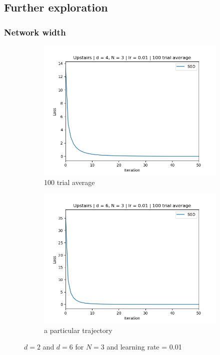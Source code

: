 \documentclass[11pt]{article}
\begin{document}
\subsection{Further exploration}

\subsubsection{Network width}
\begin{figure}[h!]
    \begin{subfigure}{0.5\textwidth}
        \centering
        \includegraphics[width=\textwidth]{images/upstairs_avg_d4.png}
        \caption{100 trial average}
        \label{fig:upstairs_avg_d4}
    \end{subfigure}
    \begin{subfigure}{0.5\textwidth}
        \centering
        \includegraphics[width=\textwidth]{images/upstairs_avg_d6.png}
        \caption{a particular trajectory}
        \label{fig:upstairs_avg_d6}
    \end{subfigure}
    \caption{$d = 2$ and $d=6$ for $N = 3$ and learning rate = 0.01}
    \label{fig:results:width}
\end{figure}
\end{document}
